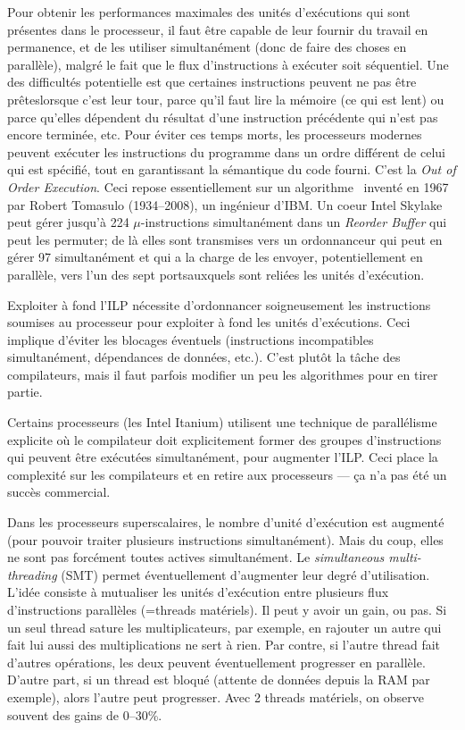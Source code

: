 Pour obtenir les performances maximales des unités d'exécutions qui sont
présentes dans le processeur, il faut être capable de leur fournir du travail en
permanence, et de les utiliser simultanément (donc de faire des choses en
parallèle), malgré le fait que le flux d'instructions à exécuter soit \og
séquentiel\fg. Une des difficultés potentielle est que certaines instructions
peuvent ne pas être \og prêtes\fg lorsque c'est leur tour, parce qu'il faut lire
la mémoire (ce qui est lent) ou parce qu'elles dépendent du résultat d'une
instruction précédente qui n'est pas encore terminée, etc. Pour éviter ces temps
morts, les processeurs modernes peuvent exécuter les instructions du programme
dans un ordre différent de celui qui est spécifié, tout en garantissant la
sémantique du code fourni. C'est la \textit{Out of Order Execution}. Ceci repose
essentiellement sur un algorithme~\cite{Tomasulo} inventé en 1967 par Robert
Tomasulo (1934--2008), un ingénieur d'IBM. Un coeur Intel Skylake peut gérer
jusqu'à 224 $\mu$-instructions simultanément dans un \textit{Reorder Buffer} qui
peut les permuter; de là elles sont transmises vers un ordonnanceur qui peut en
gérer 97 simultanément et qui a la charge de les envoyer, potentiellement en
parallèle, vers l'un des sept \og ports\fg auxquels sont reliées les unités
d'exécution.

Exploiter à fond l'ILP nécessite d'ordonnancer soigneusement les instructions
soumises au processeur pour exploiter à fond les unités d'exécutions. Ceci
implique d'éviter les blocages éventuels (instructions incompatibles
simultanément, dépendances de données, etc.). C'est plutôt la tâche des
compilateurs, mais il faut parfois modifier un peu les algorithmes pour en tirer
partie.

Certains processeurs (les Intel Itanium) utilisent une technique de parallélisme
explicite où le compilateur doit explicitement former des groupes d'instructions
qui peuvent être exécutées simultanément, pour augmenter l'ILP. Ceci place la
complexité sur les compilateurs et en retire aux processeurs --- ça n'a pas été
un succès commercial.

Dans les processeurs superscalaires, le nombre d'unité d'exécution est augmenté
(pour pouvoir traiter plusieurs instructions simultanément). Mais du coup, elles
ne sont pas forcément toutes actives simultanément. Le \emph{simultaneous
  multi-threading} (SMT) permet éventuellement d'augmenter leur degré
d'utilisation. L'idée consiste à mutualiser les unités d'exécution entre
plusieurs flux d'instructions parallèles (=threads matériels). Il peut y avoir
un gain, ou pas. Si un seul thread sature les multiplicateurs, par exemple, en
rajouter un autre qui fait lui aussi des multiplications ne sert à rien. Par
contre, si l'autre thread fait d'autres opérations, les deux peuvent
éventuellement progresser en parallèle. D'autre part, si un thread est bloqué
(attente de données depuis la RAM par exemple), alors l'autre peut
progresser. Avec 2 threads matériels, on observe souvent des gains de 0--30\%.

